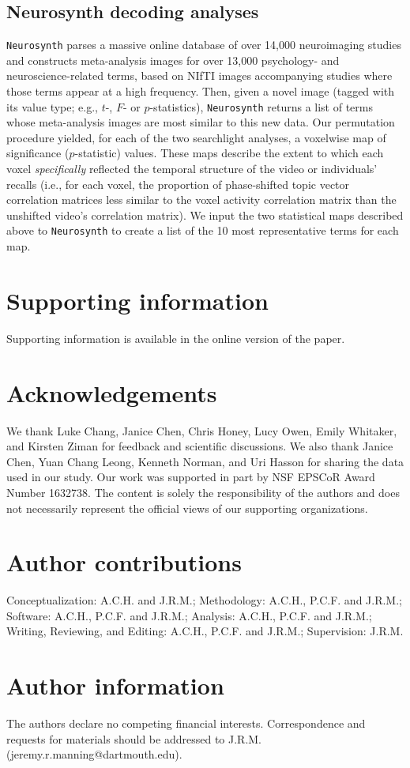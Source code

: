 \documentclass{article}
\begin{document}
\subsection*{Neurosynth decoding analyses}
\texttt{Neurosynth} parses a massive online database of over 14,000 neuroimaging studies and constructs meta-analysis images for over 13,000 psychology- and neuroscience-related terms, based on NIfTI images accompanying studies where those terms appear at a high frequency.  Then, given a novel image (tagged with its value type; e.g., $t$-, $F$- or $p$-statistics), \texttt{Neurosynth} returns a list of terms whose meta-analysis images are most similar to this new data.  Our permutation procedure yielded, for each of the two searchlight analyses, a voxelwise map of significance ($p$-statistic) values.  These maps describe the extent to which each voxel \textit{specifically} reflected the temporal structure of the video or individuals' recalls (i.e., for each voxel, the proportion of phase-shifted topic vector correlation matrices less similar to the voxel activity correlation matrix than the unshifted video's correlation matrix). We input the two statistical maps described above to \texttt{Neurosynth} to create a list of the 10 most representative terms for each map.



% 

\section*{Supporting information}
Supporting information is available in the online version of the paper.

\section*{Acknowledgements}
We thank Luke Chang, Janice Chen, Chris Honey, Lucy Owen, Emily Whitaker, and Kirsten Ziman for feedback and scientific discussions. We also thank Janice Chen, Yuan Chang Leong, Kenneth Norman, and Uri Hasson for sharing the data used in our study.  Our work was supported in part by NSF EPSCoR Award Number 1632738. The content is solely the responsibility of the authors and does not necessarily represent the official views of our supporting organizations.

\section*{Author contributions}
Conceptualization: A.C.H. and J.R.M.; Methodology: A.C.H., P.C.F. and J.R.M.; Software: A.C.H., P.C.F. and J.R.M.; Analysis: A.C.H., P.C.F. and J.R.M.; Writing, Reviewing, and Editing: A.C.H., P.C.F. and J.R.M.; Supervision: J.R.M.

\section*{Author information}
The authors declare no competing financial interests.  Correspondence and requests for materials should be addressed to J.R.M. (jeremy.r.manning@dartmouth.edu).
\end{document}
